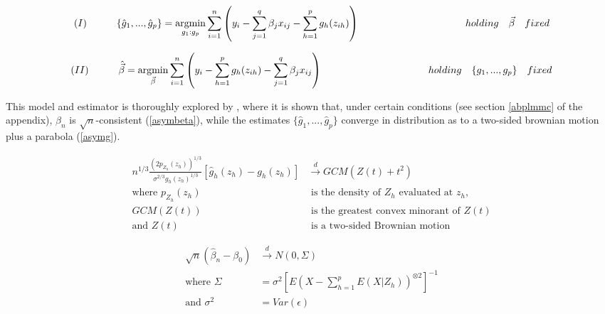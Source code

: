 \documentclass[10pt]{olplainarticle}\usepackage[]{graphicx}\usepackage[]{color}
\begin{document}
\begin{equation} \label{backfit1}
  (I) \ \ \ \ \ \ \ \ \ \{\hat{g}_1,...,\hat{g}_p\} = \underset{g_1:g_p}{\operatorname{argmin}} \sum_{i=1}^n\left(y_i-\sum_{j=1}^{q} \beta_{j} x_{ij}-\sum_{h=1}^{p} g_{h} (z_{ih})\right) \\
  \ \ \ \ \ \ \ \ \ \ \ \ \ \ \ \ \ \ \ \ \ \ \ \ \ \ \ \ \ \ \ \  holding \ \ \ \vec\beta \ \ \ fixed
\end{equation}


\begin{equation} \label{backfit2}
  (II) \ \ \ \ \ \ \ \ \ \hat{\vec{\beta}} = \underset{\vec{\beta}}{\operatorname{argmin}} \sum_{i=1}^n\left(y_i-\sum_{h=1}^{p} g_{h} (z_{ih}) - \sum_{j=1}^{q} \beta_{j} x_{ij}\right) \\
  \ \ \ \ \ \ \ \ \ \ \ \ \ \ \ \ \ \ \ \ \ \ \ \ \ \ \ \ \ \ \ \  holding \ \ \ \{g_1,...,g_p\} \ \ \ fixed
\end{equation}

This model and estimator is thoroughly explored by \cite{guangcheng}, where it is shown that, under certain conditions (see section \ref{abplmmc} of the appendix), $\hat{\beta}_n$ is $\sqrt{n}$-consistent (\ref{asymbeta}), while the estimates $\{\hat{g}_1,...,\hat{g}_p\}$ converge in distribution as to a two-sided brownian motion plus a parabola (\ref{asymg}). 

\begin{equation} \label{asymg}
\begin{aligned}
  n^{1/3}\frac{(2p_{Z_h}(z_h))^{1/3}}{\sigma^{2/3}g_h(z_h)^{1/3}}[\hat{g}_h(z_h) - g_h(z_h)] &\xrightarrow{d} GCM(Z(t) + t^2) \\ 
  \text{where } p_{Z_h}(z_h) &\text{ is the density of $Z_h$ evaluated at $z_h$,} \\
  GCM(Z(t)) &\text{ is the greatest convex minorant of } Z(t) \\
  \text{and } Z(t) &\text{ is a two-sided Brownian motion} 
\end{aligned}
\end{equation}

\begin{equation} \label{asymbeta}
\begin{aligned}
  \sqrt{n}(\hat{\beta}_n - \beta_0) &\xrightarrow{d} N(0, \Sigma) \\
  \text{where } \Sigma &= \sigma^2[E(X - \sum_{h=1}^{p}E(X|Z_h))^{\otimes 2}]^{-1} \\
  \text{and } \sigma^2 &= Var(\epsilon)
\end{aligned}
\end{equation}
\end{document}
